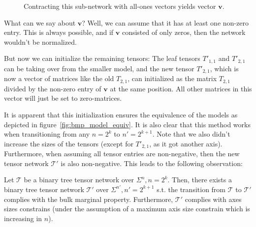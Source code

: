 \documentclass[../../main.tex]{subfiles}
\begin{document}
    \begin{figure}[h]
        \centering
        \caption{Contracting this sub-network with all-ones vectors yields vector $\bm{v}$.}
        \label{fig:sufficient_condition_bmp}
    \end{figure}

    What can we say about $\bm{v}$? Well, we can assume that it has at least one non-zero entry. This is always possible, and if $\bm{v}$ consisted of only zeros, then the network wouldn't be normalized.

    But now we can initialize the remaining tensors: The leaf tensors $T'_{1,1}$ and $T'_{2,1}$ can be taking over from the smaller model, and the new tensor $T'_{2, 1}$, which is now a vector of matrices like the old $T_{2, 1}$, can initialized as the matrix $T_{2, 1}$ divided by the non-zero entry of $\bm{v}$ at the same position. All other matrices in this vector will just be set to zero-matrices.

    It is apparent that this initialization ensures the equivalence of the models as depicted in figure~\ref{fig:bmp_model_equiv}. It is also clear that this method works when transitioning from any $n = 2^k$ to $n' = 2^{k+1}$. Note that we also didn't increase the sizes of the tensors (except for $T'_{2, 1}$, as it got another axis). Furthermore, when assuming all tensor entries are non-negative, then the new tensor network $\mathcal{T}'$ is also non-negative. This leads to the following observation:

    \begin{corollary}
        Let $\mathcal{T}$ be a binary tree tensor network over $\Sigma^n, n = 2^k$. Then, there exists a binary tree tensor network $\mathcal{T}'$ over $\Sigma^{n'}, n' = 2^{k+1}$ s.t. the transition from $\mathcal{T}$ to $\mathcal{T}'$ complies with the bulk marginal property. Furthermore, $\mathcal{T}'$ complies with axes sizes constrains (under the assumption of a maximum axis size constrain which is increasing in $n$).
    \end{corollary}
\end{document}
